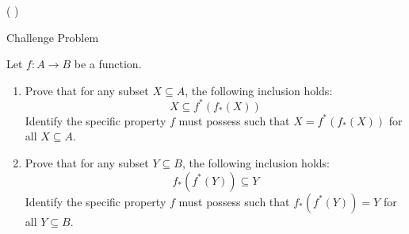 \documentclass{article}
\theoremstyle{definition}
\begin{document}
	\vspace{.2cm}

	 ( ) \vspace{.15cm}



	\vspace{1cm}




	\noindent Challenge Problem \vspace{0.3cm}

	Let $f: A \rightarrow B$ be a function.

	\begin{enumerate}
		\item Prove that for any subset $X \subseteq A$, the following inclusion holds:
		\[ X \subseteq f^{*}(f_{*}(X)) \]
		Identify the specific property $f$ must possess such that $X = f^{*}(f_{*}(X))$ for all $X \subseteq A$.

		\medskip

		\item Prove that for any subset $Y \subseteq B$, the following inclusion holds:
		\[ f_{*}(f^{*}(Y)) \subseteq Y \]
		Identify the specific property $f$ must possess such that $f_{*}(f^{*}(Y)) = Y$ for all $Y \subseteq B$.
	\end{enumerate}










\end{document}
